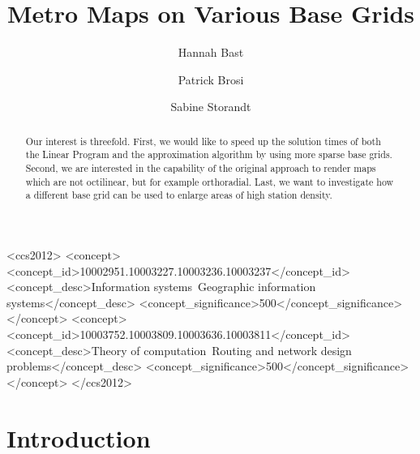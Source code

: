 \documentclass[sigconf]{acmart}
\begin{document}
\title{Metro Maps on Various Base Grids}

\author{Hannah Bast}

\author{Patrick Brosi}

\author{Sabine Storandt}

\begin{abstract}
Our interest is threefold. First, we would like to speed up the solution times of both the Linear Program and the approximation algorithm by using more sparse base grids. Second, we are interested in the capability of the original approach to render maps which are not octilinear, but for example orthoradial. Last, we want to investigate how a different base grid can be used to enlarge areas of high station density. 
\end{abstract}

%
%
\begin{CCSXML}
<ccs2012>
<concept>
<concept_id>10002951.10003227.10003236.10003237</concept_id>
<concept_desc>Information systems~Geographic information systems</concept_desc>
<concept_significance>500</concept_significance>
</concept>
<concept>
<concept_id>10003752.10003809.10003636.10003811</concept_id>
<concept_desc>Theory of computation~Routing and network design problems</concept_desc>
<concept_significance>500</concept_significance>
</concept>
</ccs2012>
\end{CCSXML}



\maketitle

\section{Introduction}
\end{document}
